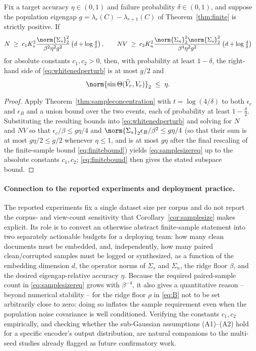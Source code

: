 \begin{corollary}
\label{cor:samplesize}
Fix a target accuracy $\eta\in(0,1)$ and failure probability $\delta\in
(0,1)$, and suppose the population eigengap $g=\lambda_r(C)-\lambda_{r+1}(C)$
of Theorem~\ref{thm:finite} is strictly positive. If
\begin{equation}
 N\;\ge\;
 c_1K_s^2\frac{\norm{\Sigma_s}_2^2}{\beta^2\eta^2g^2}
 \left(d+\log\tfrac{4}{\delta}\right),
 \qquad
 NV\;\ge\;
 c_2K_n^2\frac{\norm{\Sigma_n}_2^2\norm{\Sigma_s}_2^2}
 {\beta^4\eta^2g^2}
 \left(d+\log\tfrac{4}{\delta}\right)
 \label{eq:samplesizereq}
\end{equation}
for absolute constants $c_1,c_2>0$, then, with probability at least
$1-\delta$, the right-hand side of \cref{eq:whitenedperturb} is at most
$g/2$ and
\begin{equation}
 \norm{\sin\Theta(\widehat V_r,V_r)}_2\;\le\;\eta.
\end{equation}
\end{corollary}
\begin{proof}
Apply Theorem~\ref{thm:sampleconcentration} with $t=\log(4/\delta)$ to both
$\epsilon_c$ and $\epsilon_B$ and a union bound over the two events, each
of probability at least $1-\tfrac{\delta}{2}$. Substituting the resulting
bounds into \cref{eq:whitenedperturb} and solving for $N$ and $NV$ so that
$\epsilon_c/\beta\le g\eta/4$ and $\norm{\Sigma_s}_2\epsilon_B/\beta^2\le
g\eta/4$ (so that their sum is at most $g\eta/2\le g/2$ whenever $\eta\le1$,
and is at most $g\eta$ after the final rescaling of the finite-sample bound
\cref{eq:finitebound}) yields \cref{eq:samplesizereq} up to the absolute
constants $c_1,c_2$; \cref{eq:finitebound} then gives the stated subspace
bound.
\end{proof}

\paragraph{Connection to the reported experiments and deployment practice.}
The reported experiments fix a single dataset size per corpus and do not
report the corpus- and view-count sensitivity that
Corollary~\ref{cor:samplesize} makes explicit. Its role is to convert an
otherwise abstract finite-sample statement into two separately actionable
budgets for a deploying team: how many clean documents must be embedded,
and, independently, how many paired clean/corrupted samples must be logged
or synthesized, as a function of the embedding dimension $d$, the operator
norms of $\Sigma_s$ and $\Sigma_n$, the ridge floor $\beta$, and the desired
eigengap-relative accuracy $\eta$. Because the required paired-sample count
in \cref{eq:samplesizereq} grows with $\beta^{-4}$, it also gives a
quantitative reason -- beyond numerical stability -- for the ridge floor
$\rho$ in \cref{eq:B} not to be set arbitrarily close to zero: doing so
inflates the sample requirement even when the population noise covariance
is well conditioned. Verifying the constants $c_1,c_2$ empirically, and
checking whether the sub-Gaussian assumptions (A1)--(A2) hold for a
specific encoder's output distribution, are natural companions to the
multi-seed studies already flagged as future confirmatory work.

